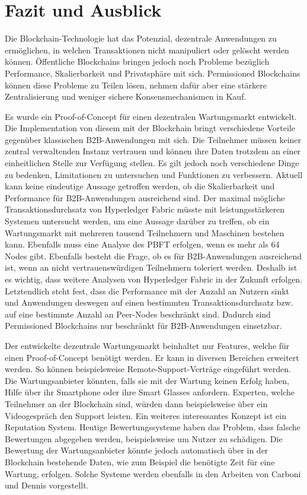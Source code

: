 \chapter{Fazit und Ausblick}
\label{cha:fazit}

Die Blockchain-Technologie hat das Potenzial, dezentrale Anwendungen zu ermöglichen, in welchen Transaktionen nicht manipuliert oder gelöscht werden können. Öffentliche Blockchains bringen jedoch noch Probleme bezüglich Performance, Skalierbarkeit und Privatsphäre mit sich. Permissioned Blockchains können diese Probleme zu Teilen lösen, nehmen dafür aber eine stärkere Zentralisierung und weniger sichere Konsensmechanismen in Kauf. 

Es wurde ein Proof-of-Concept für einen dezentralen Wartungsmarkt entwickelt. Die Implementation von diesem mit der Blockchain bringt verschiedene Vorteile gegenüber klassischen B2B-Anwendungen mit sich. Die Teilnehmer müssen keiner zentral verwaltenden Instanz vertrauen und können ihre Daten trotzdem an einer einheitlichen Stelle zur Verfügung stellen. Es gilt jedoch noch verschiedene Dinge zu bedenken, Limitationen zu untersuchen und Funktionen zu verbessern. Aktuell kann keine eindeutige Aussage getroffen werden, ob die Skalierbarkeit und Performance für B2B-Anwendungen ausreichend sind. Der maximal mögliche Transaktionsdurchsatz von Hyperledger Fabric müsste mit leistungsstärkeren Systemen untersucht werden, um eine Aussage darüber zu treffen, ob ein Wartungsmarkt mit mehreren tausend Teilnehmern und Maschinen bestehen kann. Ebenfalls muss eine Analyse des \acs{PBFT} erfolgen, wenn es mehr als 64 Nodes gibt. Ebenfalls besteht die Frage, ob es für B2B-Anwendungen ausreichend ist, wenn  an nicht vertrauenswürdigen Teilnehmern toleriert werden. Deshalb ist es wichtig, dass weitere Analysen von Hyperledger Fabric in der Zukunft erfolgen. Letztendlich steht fest, dass die Performance mit der Anzahl an Nutzern sinkt und Anwendungen deswegen auf einen bestimmten Transaktionsdurchsatz bzw. auf eine bestimmte Anzahl an Peer-Nodes beschränkt sind. Dadurch sind Permissioned Blockchains nur beschränkt für B2B-Anwendungen einsetzbar.

Der entwickelte dezentrale Wartungsmarkt beinhaltet nur Features, welche für einen Proof-of-Concept benötigt werden. Er kann in diversen Bereichen erweitert werden. So können beispielsweise Remote-Support-Verträge eingeführt werden. Die Wartungsanbieter könnten, falls sie mit der Wartung keinen Erfolg haben, Hilfe über ihr Smartphone oder ihre Smart Glasses anfordern. Experten, welche Teilnehmer an der Blockchain sind, würden dann beispielsweise über ein Videogespräch den Support leisten. Ein weiteres interessantes Konzept ist ein Reputation System. Heutige Bewertungssysteme haben das Problem, dass falsche Bewertungen abgegeben werden, beispielsweise um Nutzer zu schädigen. Die Bewertung der Wartungsanbieter könnte jedoch automatisch über in der Blockchain bestehende Daten, wie zum Beispiel die benötigte Zeit für eine Wartung, erfolgen. Solche Systeme werden ebenfalls in den Arbeiten von Carboni \cite{CarboniFeedbackbasedReputation2015} und Dennis \cite{DennisRepblocknext2015} vorgestellt.

